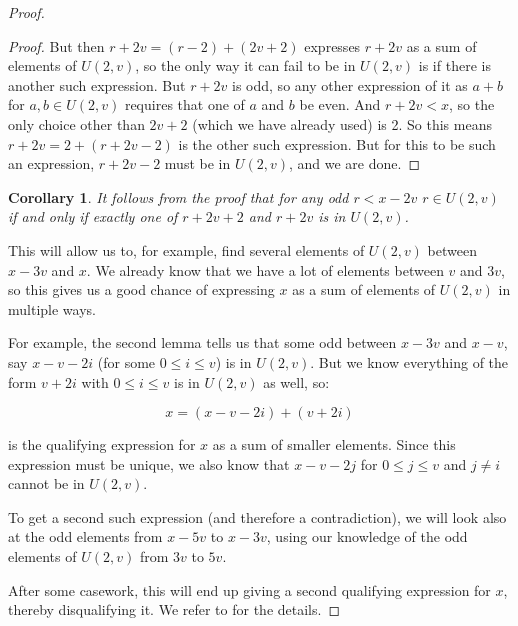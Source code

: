 \documentclass{article}
\newtheorem{corollary}{Corollary}[theorem]
\theoremstyle{definition}
\theoremstyle{remark}
\numberwithin{equation}{section}
\begin{document}
\begin{proof}
\begin{proof}
    But then $r+2v = (r-2)+(2v+2)$ expresses $r+2v$ as a sum of
    elements of $U(2,v)$, so the only way it can fail to be in
    $U(2,v)$ is if there is another such expression.  But $r+2v$ is
    odd, so any other expression of it as $a+b$ for $a, b \in U(2,v)$
    requires that one of $a$ and $b$ be even.  And $r+2v < x$, so the
    only choice other than $2v+2$ (which we have already used) is 2.
    So this means $r+2v = 2+(r+2v-2)$ is the other such expression.
    But for this to be such an expression, $r+2v-2$ must be in
    $U(2,v)$, and we are done.
  \end{proof}

  \begin{corollary}
    It follows from the proof that for any odd $r < x-2v$
    $r \in U(2,v)$ if and only if exactly one of $r+2v+2$ and $r+2v$
    is in $U(2,v)$.
  \end{corollary}

  This will allow us to, for example, find several elements of
  $U(2,v)$ between $x-3v$ and $x$.  We already know that we have a lot
  of elements between $v$ and $3v$, so this gives us a good chance of
  expressing $x$ as a sum of elements of $U(2,v)$ in multiple ways.  

  For example, the second lemma tells us that some odd between $x-3v$
  and $x-v$, say $x-v-2i$ (for some $0 \leq i \leq v$) is in
  $U(2,v)$.  But we know everything of the form $v+2i$ with $0 \leq i
  \leq v$ is in $U(2,v)$ as well, so: 

  \[x = (x-v-2i)+(v+2i)\]

  is the qualifying expression for $x$ as a sum of smaller elements.
  Since this expression must be unique, we also know that $x-v-2j$ for
  $0 \leq j \leq v$ and $j \neq i$ cannot be in $U(2,v)$.  

  To get a second such expression (and therefore a contradiction), we
  will look also at the odd elements from $x-5v$ to $x-3v$, using our
  knowledge of the odd elements of $U(2,v)$ from $3v$ to $5v$.  

  After some casework, this will end up giving a second qualifying
  expression for $x$, thereby disqualifying it.  We refer to
  \cite{regularity_schmerl} for the details.
  

  \end{proof}
\end{document}
